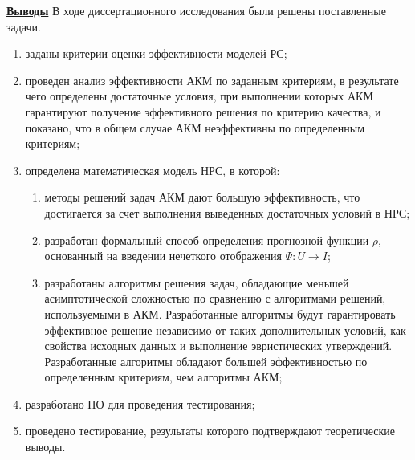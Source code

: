 \documentclass[a4paper,14pt]{report}
\newcommand{\rh}{\overline{\rho}}
\theoremstyle{plain}
\theoremstyle{break}
\begin{document}
\underline{\bf Выводы}
В ходе диссертационного исследования были решены поставленные задачи.
\begin{enumerate}
	\item заданы критерии оценки эффективности моделей РС;
	\item проведен анализ эффективности АКМ по
		заданным критериям, в результате чего определены достаточные условия, при
		выполнении которых АКМ гарантируют получение
		эффективного решения по критерию качества, и показано, что в общем
		случае АКМ неэффективны по определенным критериям;
	\item определена математическая модель НРС, в которой:
		\begin{enumerate}
			\item методы решений задач АКМ дают большую эффективность,
				что достигается за счет выполнения выведенных
				достаточных условий в НРС;

			\item разработан формальный способ определения прогнозной функции
				$\rh$, основанный на введении нечеткого отображения
				$\Psi: U \rightarrow I$;

			\item разработаны алгоритмы решения задач, обладающие меньшей
				асимптотической сложностью по сравнению с алгоритмами
				решений, используемыми в АКМ.
				Разработанные алгоритмы будут гарантировать эффективное
				решение независимо от таких дополнительных условий,
				как свойства исходных данных и выполнение
				эвристических утверждений. Разработанные алгоритмы обладают
				большей эффективностью по определенным критериям, чем алгоритмы
				АКМ;

		\end{enumerate}
	\item разработано ПО для проведения тестирования;
	\item проведено тестирование, результаты которого подтверждают
		теоретические выводы.
\end{enumerate}
\end{document}
